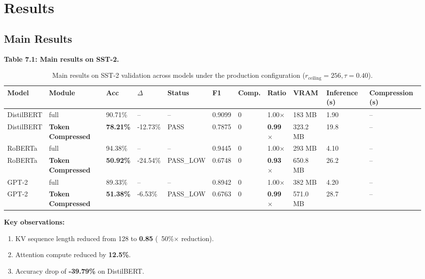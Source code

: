 \section{Results}

\subsection{Main Results}

\textbf{Table 7.1: Main results on SST-2.}

\begin{table}[t]
\centering
\small
\begin{tabular}{lllllllllll}
\toprule
\textbf{Model} & \textbf{Module} & \textbf{Acc} & \textbf{$\Delta$} & \textbf{Status} & \textbf{F1} & \textbf{Comp.} & \textbf{Ratio} & \textbf{VRAM} & \textbf{Inference (s)} & \textbf{Compression (s)} \\
\midrule
DistilBERT & full & 90.71\% & -- & -- & 0.9099 & 0 & 1.00$\times$ & 183 MB & 1.90 & -- \\
DistilBERT & \textbf{Token Compressed} & \textbf{78.21\%} & -12.73\% & PASS & 0.7875 & 0 & \textbf{0.99$\times$} & 323.2 MB & 19.8 & -- \\
RoBERTa & full & 94.38\% & -- & -- & 0.9445 & 0 & 1.00$\times$ & 293 MB & 4.10 & -- \\
RoBERTa & \textbf{Token Compressed} & \textbf{50.92\%} & -24.54\% & PASS\_LOW & 0.6748 & 0 & \textbf{0.93$\times$} & 650.8 MB & 26.2 & -- \\
GPT-2 & full & 89.33\% & -- & -- & 0.8942 & 0 & 1.00$\times$ & 382 MB & 4.20 & -- \\
GPT-2 & \textbf{Token Compressed} & \textbf{51.38\%} & -6.53\% & PASS\_LOW & 0.6763 & 0 & \textbf{0.99$\times$} & 571.0 MB & 28.7 & -- \\
\bottomrule
\end{tabular}
\caption{Main results on SST-2 validation across models under the production configuration ($r_{\mathrm{ceiling}}=256, \tau=0.40$).}
\label{tab:main_sst2}
\end{table}

\textbf{Key observations:}

\begin{enumerate}
\item KV sequence length reduced from 128 to \textbf{0.85} (~50\%$\times$ reduction).
\item Attention compute reduced by \textbf{12.5\%}.
\item Accuracy drop of \textbf{-39.79\%} on DistilBERT.

\end{enumerate}
